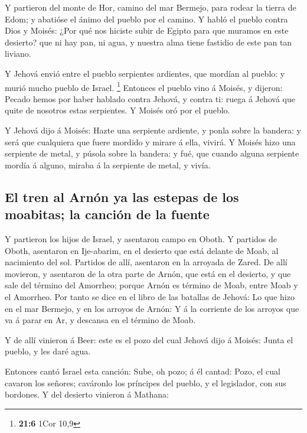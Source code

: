  Y partieron del monte de Hor, camino del mar Bermejo,
para rodear la tierra de Edom; y abatióse el ánimo del pueblo por el
camino.  Y habló el pueblo contra Dios y Moisés: ¿Por qué
nos hiciste subir de Egipto para que muramos en este desierto? que ni
hay pan, ni agua, y nuestra alma tiene fastidio de este pan tan liviano.

 Y Jehová envió entre el pueblo serpientes ardientes, que
mordían al pueblo: y murió mucho pueblo de Israel. \footnote{\textbf{21:6}
  1Cor 10,9}  Entonces el pueblo vino á Moisés, y dijeron:
Pecado hemos por haber hablado contra Jehová, y contra ti: ruega á
Jehová que quite de nosotros estas serpientes. Y Moisés oró por el
pueblo.

 Y Jehová dijo á Moisés: Hazte una serpiente ardiente, y
ponla sobre la bandera: y será que cualquiera que fuere mordido y mirare
á ella, vivirá.  Y Moisés hizo una serpiente de metal, y
púsola sobre la bandera: y fué, que cuando alguna serpiente mordía á
alguno, miraba á la serpiente de metal, y vivía.

\hypertarget{el-tren-al-arnuxf3n-ya-las-estepas-de-los-moabitas-la-canciuxf3n-de-la-fuente}{%
\subsection{El tren al Arnón ya las estepas de los moabitas; la canción
de la
fuente}\label{el-tren-al-arnuxf3n-ya-las-estepas-de-los-moabitas-la-canciuxf3n-de-la-fuente}}

 Y partieron los hijos de Israel, y asentaron campo en
Oboth.  Y partidos de Oboth, asentaron en Ije-abarim, en
el desierto que está delante de Moab, al nacimiento del sol.
 Partidos de allí, asentaron en la arroyada de Zared.
 De allí movieron, y asentaron de la otra parte de Arnón,
que está en el desierto, y que sale del término del Amorrheo; porque
Arnón es término de Moab, entre Moab y el Amorrheo.  Por
tanto se dice en el libro de las batallas de Jehová: Lo que hizo en el
mar Bermejo, y en los arroyos de Arnón:  Y á la corriente
de los arroyos que va á parar en Ar, y descansa en el término de Moab.

 Y de allí vinieron á Beer: este es el pozo del cual
Jehová dijo á Moisés: Junta el pueblo, y les daré agua.

 Entonces cantó Israel esta canción: Sube, oh pozo; á él
cantad:  Pozo, el cual cavaron los señores; caváronlo los
príncipes del pueblo, y el legislador, con sus bordones. Y del desierto
vinieron á Mathana:

